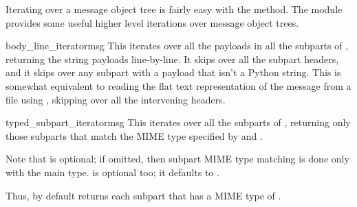 
Iterating over a message object tree is fairly easy with the
 method.  The  module
provides some useful higher level iterations over message object
trees.

\begin{funcdesc}{body_line_iterator}{msg}
This iterates over all the payloads in all the subparts of ,
returning the string payloads line-by-line.  It skips over all the
subpart headers, and it skips over any subpart with a payload that
isn't a Python string.  This is somewhat equivalent to reading the
flat text representation of the message from a file using
, skipping over all the intervening headers.
\end{funcdesc}

\begin{funcdesc}{typed_subpart_iterator}{msg}
This iterates over all the subparts of , returning only those
subparts that match the MIME type specified by  and
.

Note that  is optional; if omitted, then subpart MIME
type matching is done only with the main type.   is
optional too; it defaults to .

Thus, by default  returns each
subpart that has a MIME type of .
\end{funcdesc}

